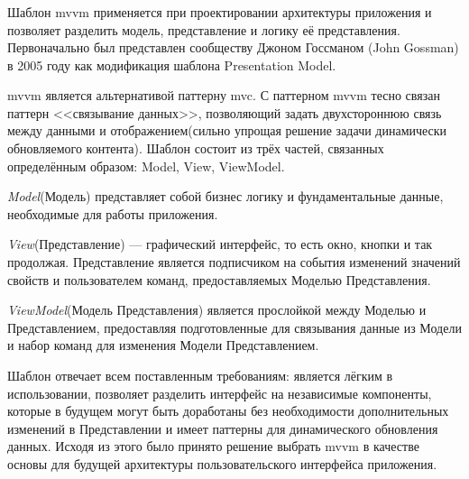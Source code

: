 \subsubsection {}
\label{sec:analysis:research:mobArch:mvvm}

Шаблон \gls{mvvm} применяется при проектировании архитектуры приложения и позволяет разделить модель, представление и логику её представления. Первоначально был представлен сообществу Джоном Госсманом (John Gossman) в 2005 году как модификация шаблона Presentation Model. \cite{wiki:mvvm}

\gls{mvvm} является альтернативой паттерну \gls{mvc}. С паттерном \gls{mvvm} тесно связан паттерн <<связывание данных>>, позволяющий задать двухстороннюю связь между данными и отображением(сильно упрощая решение задачи динамически обновляемого контента). Шаблон состоит из трёх частей, связанных определённым образом: Model, View, ViewModel.

\emph{Model}(Модель) представляет собой бизнес логику и фундаментальные данные, необходимые для работы приложения.

\emph{View}(Представление) --- графический интерфейс, то есть окно, кнопки и так продолжая. Представление является подписчиком на события изменений значений свойств и пользователем команд, предоставляемых Моделью Представления.

\emph{ViewModel}(Модель Представления) является прослойкой между Моделью и Представлением, предоставляя подготовленные для связывания данные из Модели и набор команд для изменения Модели Представлением.

Шаблон отвечает всем поставленным требованиям: является лёгким в использовании, позволяет разделить интерфейс на независимые компоненты, которые в будущем могут быть доработаны без необходимости дополнительных изменений в Представлении и имеет паттерны для динамического обновления данных. Исходя из этого было принято решение выбрать \gls{mvvm} в качестве основы для будущей архитектуры пользовательского интерфейса приложения.